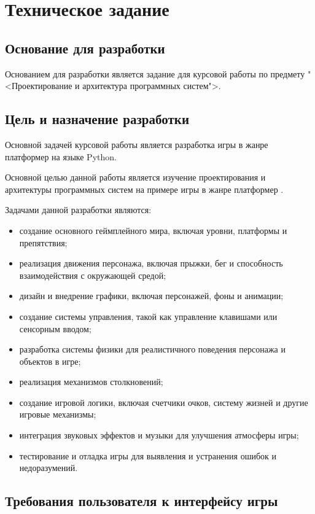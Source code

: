 \section{Техническое задание}
\subsection{Основание для разработки}

Основанием для разработки является задание для курсовой работы по предмету   "<Проектирование и архитектура программных систем">.

\subsection{Цель и назначение разработки}

Основной задачей курсовой работы является разработка игры в жанре платформер на языке Python.

Основной целью данной работы является изучение проектирования и архитектуры программных систем на примере игры в жанре платформер .

Задачами данной разработки являются:
\begin{itemize}
\item создание основного геймплейного мира, включая уровни, платформы и препятствия;
\item реализация движения персонажа, включая прыжки, бег и способность взаимодействия с окружающей средой;
\item дизайн и внедрение графики, включая персонажей, фоны и анимации;
\item создание системы управления, такой как управление клавишами или сенсорным вводом;
\item разработка системы физики для реалистичного поведения персонажа и объектов в игре;
\item реализация механизмов столкновений;
\item создание игровой логики, включая счетчики очков, систему жизней и другие игровые механизмы;
\item интеграция звуковых эффектов и музыки для улучшения атмосферы игры;
\item тестирование и отладка игры для выявления и устранения ошибок и недоразумений.
\end{itemize}

\subsection{Требования пользователя к интерфейсу игры}


